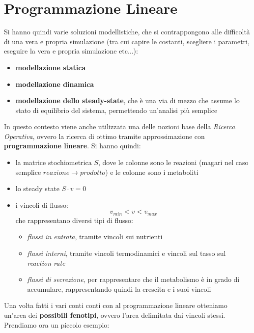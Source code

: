 \documentclass[a4paper,12pt, oneside]{book}
\begin{document}
\section{Programmazione Lineare}
Si hanno quindi varie soluzioni modellistiche, che si contrappongono alle
difficoltà di una vera e propria simulazione (tra cui capire le costanti,
scegliere i parametri, eseguire la vera e propria simulazione etc$\ldots$):
\begin{itemize}
  \item \textbf{modellazione statica}
  \item \textbf{modellazione dinamica}
  \item \textbf{modellazione dello steady-state}, che è una via di mezzo che
  assume lo stato di equilibrio del sistema, permettendo un'analisi più semplice
\end{itemize}
In questo contesto viene anche utilizzata una delle nozioni base della
\textit{Ricerca Operativa}, ovvero la ricerca di ottimo tramite approssimazione
con \textbf{programmazione lineare}. Si hanno quindi:
\begin{itemize}
  \item la matrice stochiometrica $S$, dove le colonne sono le reazioni (magari
  nel caso semplice $reazione\to prodotto$) e le colonne sono i metaboliti
  \item lo steady state $S\cdot v = 0$
  \item i vincoli di flusso:
  \[v_{min}<v<v_{max}\]
  che rappresentano diversi tipi di flusso:
  \begin{itemize}
    \item \textit{flussi in entrata}, tramite vincoli sui nutrienti
    \item \textit{flussi interni}, tramite vincoli termodinamici e vincoli sul
    tasso sul \textit{reaction rate}
    \item \textit{flussi di secrezione}, per rappresentare che il metabolismo è
    in grado di accumulare, rappresentando quindi la crescita e i suoi vincoli
  \end{itemize}
\end{itemize}
Una volta fatti i vari conti conti con al programmazione lineare otteniamo
un'area dei \textbf{possibili fenotipi}, ovvero l'area delimitata dai vincoli
stessi.
\newpage
Prendiamo ora un piccolo esempio:
\end{document}
